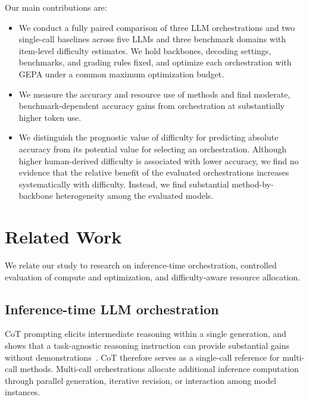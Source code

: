 \documentclass[a4paper]{article}
\theoremstyle{plain}
\theoremstyle{definition}
\theoremstyle{remark}
\begin{document}
Our main contributions are:
\begin{itemize}
\item We conduct a fully paired comparison of three LLM orchestrations and two single-call baselines across five LLMs and three benchmark domains with item-level difficulty estimates.
We hold backbones, decoding settings, benchmarks, and grading rules fixed, and optimize each orchestration with GEPA under a common maximum optimization budget.
\item We measure the accuracy and resource use of methods and find moderate, benchmark-dependent accuracy gains from orchestration at substantially higher token use.
\item We distinguish the prognostic value of difficulty for predicting absolute accuracy from its potential value for selecting an orchestration.
Although higher human-derived difficulty is associated with lower accuracy, we find no evidence that the relative benefit of the evaluated orchestrations increases systematically with difficulty.
Instead, we find substantial method-by-backbone heterogeneity among the evaluated models.
\end{itemize}

\section{Related Work}
\label{related-work}

We relate our study to research on inference-time orchestration, controlled evaluation of compute and optimization, and difficulty-aware resource allocation.

\subsection{Inference-time LLM orchestration}

CoT prompting elicits intermediate reasoning within a single generation, and shows that a task-agnostic reasoning instruction can provide substantial gains without demonstrations~\citep{wei_chain--thought_2022,kojima_large_2022}.
CoT therefore serves as a single-call reference for multi-call methods.
Multi-call orchestrations allocate additional inference computation through parallel generation, iterative revision, or interaction among model instances.
\end{document}
